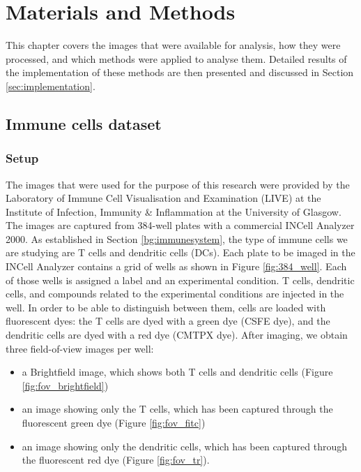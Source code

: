 \chapter{Materials and Methods} \label{sec:mm}

This chapter covers the images that were available for analysis, how they were processed, and which methods were applied to analyse them. Detailed results of the implementation of these methods are then presented and discussed in Section \ref{sec:implementation}.

\section{Immune cells dataset}

\subsection{Setup}

The images that were used for the purpose of this research were provided by the Laboratory of Immune Cell Visualisation and Examination (LIVE) at the Institute of Infection, Immunity \& Inflammation at the University of Glasgow. The images are captured from 384-well plates with a commercial INCell Analyzer 2000. As established in Section \ref{bg:immunesystem}, the type of immune cells we are studying are T cells and dendritic cells (DCs). Each plate to be imaged in the INCell Analyzer contains a grid of wells as shown in Figure \ref{fig:384_well}. Each of those wells is assigned a label and an experimental condition. T cells, dendritic cells, and compounds related to the experimental conditions are injected in the well. In order to be able to distinguish between them, cells are loaded with fluorescent dyes: the T cells are dyed with a green dye (CSFE dye), and the dendritic cells are dyed with a red dye (CMTPX dye). After imaging, we obtain three field-of-view images per well: 

\begin{itemize}
    \item a Brightfield image, which shows both T cells and dendritic cells (Figure \ref{fig:fov_brightfield})
    \item an image showing only the T cells, which has been captured through the fluorescent green dye (Figure \ref{fig:fov_fitc})
    \item an image showing only the dendritic cells, which has been captured through the fluorescent red dye (Figure \ref{fig:fov_tr}).
\end{itemize}

